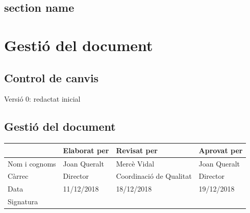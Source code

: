 \documentclass[fontsize=10pt,%
paper=a4,%
DIV=14,%
twoside,%
pagesize=auto,%
parskip=half,
captions=tableheading,%
numbers=noenddot,%
toc=graduated%
]{scrreprt}
\renewcommand{\arraystretch}{1.75}%
\renewcommand{\arraystretch}{1.75}%
\begin{document}



\thispagestyle{empty}
\setcounter{tocdepth}{4}
\tableofcontents

\clearpage

\pagestyle{scrheadings}


\section{section name}\label{sec:intro}



\chapter{Gestió del document}

\section{Control de canvis}

Versió 0: redactat inicial

\section{Gestió del document}\label{sec:gestiodoc}


\begin{center}\scriptsize\sffamily
\renewcommand{\arraystretch}{1.75}%
\begin{tabular}{lllp{4cm}}\hline
              & Elaborat per  & Revisat per   & Aprovat per\\ \hline
Nom i cognoms & Joan Queralt & Mercè Vidal & Joan Queralt\\
Càrrec        & Director & Coordinació de Qualitat & Director\\
Data          & 11/12/2018 & 18/12/2018 & 19/12/2018\\\hline
Signatura     &   &   &
\end{tabular}
\end{center}
\end{document}
